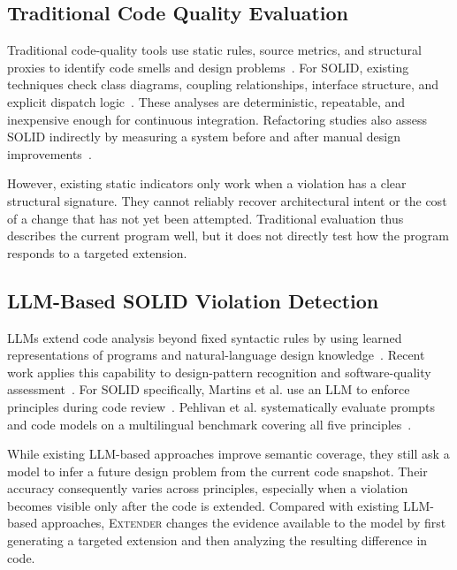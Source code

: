 \documentclass[sigconf,screen]{acmart}
\newcommand{\tool}{\textsc{Extender}\xspace}
\begin{document}
\subsection{Traditional Code Quality Evaluation}
Traditional code-quality tools use static rules, source metrics, and structural proxies to identify code smells and design problems~\cite{Sharma2018,Palomba2015}.
For SOLID, existing techniques check class diagrams, coupling relationships, interface structure, and explicit dispatch logic~\cite{Oktafiani2018,Chebanyuk2016,Roy2024}.
These analyses are deterministic, repeatable, and inexpensive enough for continuous integration.  
Refactoring studies also assess SOLID indirectly by measuring a system before and after manual design improvements~\cite{Ampatzoglou2019,Yanakiev2025}.

However, existing static indicators only work when a violation has a clear structural signature.
They cannot reliably recover architectural intent or the cost of a change that has not yet been attempted.  
Traditional evaluation thus describes the current program well, but it does not directly test how the program responds to a targeted extension.



\subsection{LLM-Based SOLID Violation Detection}
LLMs extend code analysis beyond fixed syntactic rules by using learned representations of programs and natural-language design knowledge~\cite{Chen2021,Roziere2024,Guo2024,Fan2023}.
Recent work applies this capability to design-pattern recognition and software-quality assessment~\cite{AzimHassan2024,Martins2024}.  
For SOLID specifically, Martins et al. use an LLM to enforce principles during code review~\cite{Martins2024}.
Pehlivan et al. systematically evaluate prompts and code models on a multilingual benchmark covering all five principles~\cite{Pehlivan2025}.

While existing LLM-based approaches improve semantic coverage, they still ask a model to infer a future design problem from the current code snapshot.
Their accuracy consequently varies across principles, especially when a violation becomes visible only after the code is extended.  
Compared with existing LLM-based approaches, \tool changes the evidence available to the model by first generating a targeted extension and then analyzing the resulting difference in code.
\end{document}
